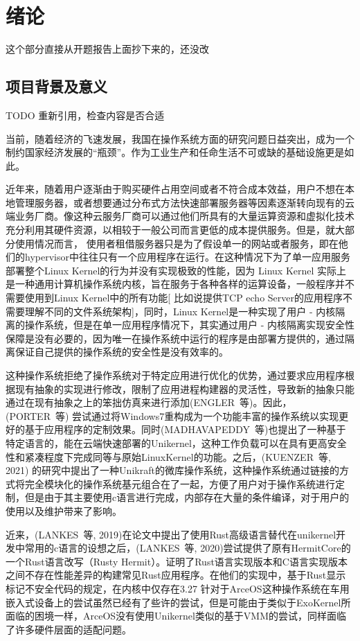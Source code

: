 \section{绪论}
这个部分直接从开题报告上面抄下来的，还没改

\subsection{项目背景及意义}
TODO 重新引用，检查内容是否合适

当前，随着经济的飞速发展，我国在操作系统方面的研究问题日益突出，成为一个制约国家经济发展的“瓶颈”。作为工业生产和任命生活不可或缺的基础设施更是如此。

近年来，随着用户逐渐由于购买硬件占用空间或者不符合成本效益，用户不想在本地管理服务器，或者想要通过分布式方法快速部署服务器等因素逐渐转向现有的云端业务厂商。像这种云服务厂商可以通过他们所具有的大量运算资源和虚拟化技术充分利用其硬件资源，以相较于一般公司而言更低的成本提供服务。但是，就大部分使用情况而言， 使用者租借服务器只是为了假设单一的网站或者服务，即在他们的hypervisor中往往只有一个应用程序在运行。在这种情况下为了单一应用服务部署整个Linux Kernel的行为并没有实现极致的性能，因为 Linux Kernel 实际上是一种通用计算机操作系统内核，旨在服务于各种各样的运算设备，一般程序并不需要使用到Linux Kernel中的所有功能[ 比如说提供TCP echo Server的应用程序不需要理解不同的文件系统架构]，同时，Linux Kernel是一种实现了用户 - 内核隔离的操作系统，但是在单一应用程序情况下，其实通过用户 - 内核隔离实现安全性保障是没有必要的，因为唯一在操作系统中运行的程序是由部署方提供的，通过隔离保证自己提供的操作系统的安全性是没有效率的。

这种操作系统拒绝了操作系统对于特定应用进行优化的优势，通过要求应用程序根据现有抽象的实现进行修改，限制了应用进程构建器的灵活性，导致新的抽象只能通过在现有抽象之上的笨拙仿真来进行添加(ENGLER 等)。因此，(PORTER 等) 尝试通过将Windows7重构成为一个功能丰富的操作系统以实现更好的基于应用程序的定制效果。同时(MADHAVAPEDDY 等)也提出了一种基于特定语言的，能在云端快速部署的Unikernel，这种工作负载可以在具有更高安全性和紧凑程度下完成同等与原始LinuxKernel的功能。之后，(KUENZER 等, 2021) 的研究中提出了一种Unikraft的微库操作系统，这种操作系统通过链接的方式将完全模块化的操作系统基元组合在了一起，方便了用户对于操作系统进行定制，但是由于其主要使用c语言进行完成，内部存在大量的条件编译，对于用户的使用以及维护带来了影响。

近来，(LANKES 等, 2019)在论文中提出了使用Rust高级语言替代在unikernel开发中常用的c语言的设想之后，(LANKES 等, 2020)尝试提供了原有HermitCore的一个Rust语言改写（Rusty Hermit）。证明了Rust语言实现版本和C语言实现版本之间不存在性能差异的构建常见Rust应用程序。在他们的实现中，基于Rust显示标记不安全代码的规定，在内核中仅存在3.27%
针对于ArceOS这种操作系统在车用嵌入式设备上的尝试虽然已经有了些许的尝试，但是可能由于类似于ExoKernel所面临的困境一样，ArceOS没有使用Unikernel类似的基于VMM的尝试，同样面临了许多硬件层面的适配问题。

